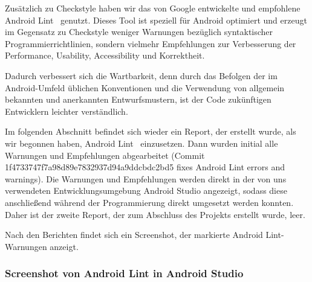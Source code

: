 
Zusätzlich zu Checkstyle haben wir das von Google entwickelte und empfohlene \glqq Android Lint\grqq~ genutzt. Dieses Tool ist speziell für Android optimiert und erzeugt im Gegensatz zu Checkstyle weniger Warnungen bezüglich syntaktischer Programmierrichtlinien, sondern vielmehr Empfehlungen zur Verbesserung der Performance, Usability, Accessibility und Korrektheit.

Dadurch verbessert sich die Wartbarkeit, denn durch das Befolgen der im Android-Umfeld üblichen Konventionen und die Verwendung von allgemein bekannten und anerkannten Entwurfsmustern, ist der Code zukünftigen Entwicklern leichter verständlich.

Im folgenden Abschnitt befindet sich wieder ein Report, der erstellt wurde, als wir begonnen haben, \glqq Android Lint\grqq~ einzusetzen. Dann wurden initial alle Warnungen und Empfehlungen abgearbeitet (Commit 1f4733747f7a98d89e7832937d94a9ddcbdc2bd5 \glqq fixes Android Lint errors and warnings\grqq). Die Warnungen und Empfehlungen werden direkt in der von uns verwendeten Entwicklungsumgebung Android Studio angezeigt, sodass diese anschließend während der Programmierung direkt umgesetzt werden konnten. Daher ist der zweite Report, der zum Abschluss des Projekts erstellt wurde, leer.

Nach den Berichten findet sich ein Screenshot, der markierte Android Lint-Warnungen anzeigt.







\subsubsection{Screenshot von Android Lint in Android Studio}

